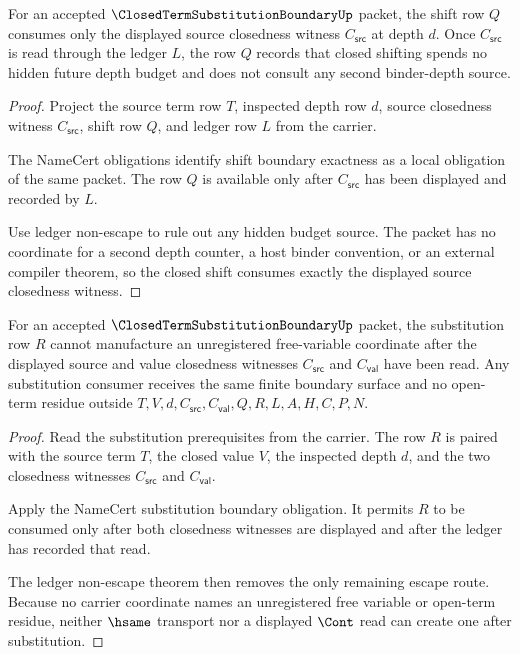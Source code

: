 \begin{theorem}
\label{thm:closed-term-substitution-boundary-shift-budget-exhaustion}
For an accepted $\ClosedTermSubstitutionBoundaryUp$ packet, the shift row $Q$ consumes only the displayed source closedness witness $C_{\mathsf{src}}$ at depth $d$. Once $C_{\mathsf{src}}$ is read through the ledger $L$, the row $Q$ records that closed shifting spends no hidden future depth budget and does not consult any second binder-depth source.
\end{theorem}
\begin{proof}
Project the source term row $T$, inspected depth row $d$, source closedness witness $C_{\mathsf{src}}$, shift row $Q$, and ledger row $L$ from the carrier.

The NameCert obligations identify shift boundary exactness as a local obligation of the same packet. The row $Q$ is available only after $C_{\mathsf{src}}$ has been displayed and recorded by $L$.

Use ledger non-escape to rule out any hidden budget source. The packet has no coordinate for a second depth counter, a host binder convention, or an external compiler theorem, so the closed shift consumes exactly the displayed source closedness witness.
\end{proof}

\begin{theorem}
\label{thm:closed-term-substitution-boundary-substitution-free-variable-nonescape}
For an accepted $\ClosedTermSubstitutionBoundaryUp$ packet, the substitution row $R$ cannot manufacture an unregistered free-variable coordinate after the displayed source and value closedness witnesses $C_{\mathsf{src}}$ and $C_{\mathsf{val}}$ have been read. Any substitution consumer receives the same finite boundary surface and no open-term residue outside $T,V,d,C_{\mathsf{src}},C_{\mathsf{val}},Q,R,L,A,H,C,P,N$.
\end{theorem}
\begin{proof}
Read the substitution prerequisites from the carrier. The row $R$ is paired with the source term $T$, the closed value $V$, the inspected depth $d$, and the two closedness witnesses $C_{\mathsf{src}}$ and $C_{\mathsf{val}}$.

Apply the NameCert substitution boundary obligation. It permits $R$ to be consumed only after both closedness witnesses are displayed and after the ledger has recorded that read.

The ledger non-escape theorem then removes the only remaining escape route. Because no carrier coordinate names an unregistered free variable or open-term residue, neither $\hsame$ transport nor a displayed $\Cont$ read can create one after substitution.
\end{proof}

